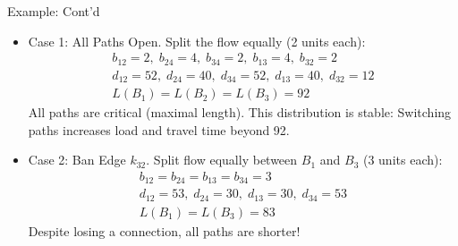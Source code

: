 \documentclass[10pt]{beamer}
\begin{document}
\begin{frame}{\cite{braess05} Example: Cont'd}
  \begin{itemize}[<+->]
    \item Case 1: All Paths Open. Split the flow equally (2 units each):
    \onslide<+->
    \begin{gather*}
      b_{12} = 2, \; b_{24} = 4, \; b_{34} = 2, \;b_{13} = 4, \; b_{32} = 2\\
      d_{12} = 52, \; d_{24} = 40, \; d_{34} = 52, \; d_{13} = 40, \; d_{32} = 12 \\
      L(B_1) = L(B_2) = L(B_3) = 92
    \end{gather*}
    \onslide<+->
    All paths are critical (maximal length). This distribution is stable: Switching paths increases load and travel time beyond 92.

    \item Case 2: Ban Edge $k_{32}$. Split flow equally between $B_1$ and $B_3$ (3 units each):
    \onslide<+->
    \begin{gather*}
      b_{12} = b_{24} = b_{13} = b_{34} = 3\\
      d_{12} = 53, \; d_{24} = 30, \; d_{13} = 30, \; d_{34} = 53\\
      L(B_1) = L(B_3) = 83
    \end{gather*}
    \onslide<+->
    Despite losing a connection, all paths are shorter!
\end{itemize}
\end{frame}
\end{document}
